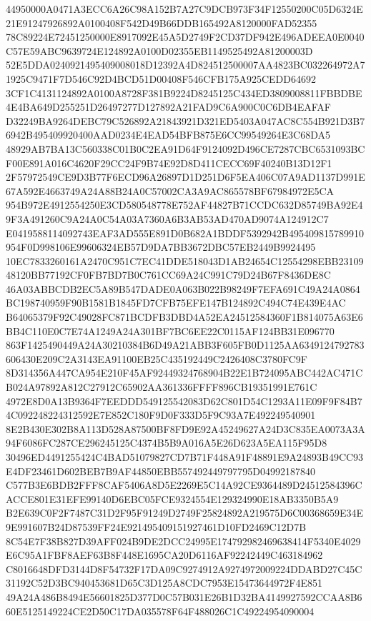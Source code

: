 \documentclass[UTF8,fontset=fandol,zihao=-4,a4paper]{ctexart}
\begin{document}
{{44950000A0471A3ECC6A26C98A152B7A27C9DCB973F34F12550200C05D6324E21E91247926892A0100408F542D49B66DDB165492A8120000FAD52355
78C89224E72451250000E8917092E45A5D2749F2CD37DF942E496ADEEA0E0040C57E59ABC9639724E124892A0100D02355EB1149525492A81200003D
52E5DDA0240921495409008018D12392A4D824512500007AA4823BC032264972A71925C9471F7D546C92D4BCD51D00408F546CFB175A925CEDD64692
3CF1C4131124892A0100A8728F381B9224D8245125C434ED3809008811FBBDBE4E4BA649D255251D26497277D127892A21FAD9C6A900C0C6DB4EAFAF
D32249BA9264DEBC79C526892A21843921D321ED5403A047AC8C554B921D3B76942B495409920400AAD0234E4EAD54BFB875E6CC99549264E3C68DA5
48929AB7BA13C560338C01B0C2EA91D64F9124092D496CE7287CBC6531093BCF00E891A016C4620F29CC24F9B74E92D8D411CECC69F40240B13D12F1
2F57972549CE9D3B77F6ECD96A26897D1D251D6F5EA406C07A9AD1137D991E67A592E4663749A24A88B24A0C57002CA3A9AC865578BF67984972E5CA
954B972E4912554250E3CD580548778E752AF44827B71CCDC632D85749BA92E49F3A491260C9A24A0C54A03A7360A6B3AB53AD470AD9074A124912C7
E0419588114092743EAF3AD555E891D0B682A1BDDF5392942B495409815789910954F0D998106E99606324EB57D9DA7BB3672DBC57EB2449B9924495
10EC7833260161A2470C951C7EC41DDE518043D1AB24654C12554298EBB2310948120BB77192CF0FB7BD7B0C761CC69A24C991C79D24B67F8436DE8C
46A03ABBCDB2EC5A89B547DADE0A063B022B98249F7EFA691C49A24A0864BC198740959F90B1581B1845FD7CFB75EFE147B124892C494C74E439E4AC
B64065379F92C49028FC871BCDFB3DBD4A52EA24512584360F1B814075A63E6BB4C110E0C7E74A1249A24A301BF7BC6EE22C0115AF124BB31E096770
863F1425490449A24A30210384B6D49A21ABB3F605FB0D1125AA6349124792783606430E209C2A3143EA91100EB25C435192449C2426408C3780FC9F
8D314356A447CA954E210F45AF92449324768904B22E1B724095ABC442AC471CB024A97892A812C27912C65902AA361336FFFF896CB19351991E761C
4972E8D0A13B9364F7EEDDD549125542083D62C801D54C1293A11E09F9F84B74C092248224312592E7E852C180F9D0F333D5F9C93A7E492249540901
8E2B430E302B8A113D528A87500BF8FD9E92A45249627A24D3C835EA0073A3A94F6086FC287CE296245125C4374B5B9A016A5E26D623A5EA115F95D8
30496ED4491255424C4BAD51079827CD7B71F448A91F48891E9A24893B49CC93E4DF23461D602BEB7B9AF44850EBB557492449797795D04992187840
C577B3E6BDB2FFF8CAF5406A8D5E2269E5C14A92CE9364489D24512584396CACCE801E31EFE99140D6EBC05FCE9324554E129324990E18AB3350B5A9
B2E639C0F2F7487C31D2F95F91249D2749F25824892A219575D6C00368659E34E9E991607B24D87539FF24E921495409151927461D10FD2469C12D7B
8C54E7F38B827D39AFF024B9DE2DCC24995E174792982469638414F5340E4029E6C95A1FBF8AEF63B8F448E1695CA20D6116AF92242449C463184962
C8016648DFD3144D8F54732F17DA09C9274912A9274972009224DDABD27C45C31192C52D3BC940453681D65C3D125A8CDC7953E15473644972F4E851
49A24A486B8494E56601825D377D0C57B031E26B1D32BA4149927592CCAA8B660E5125149224CE2D50C17DA035578F64F488026C1C49224954090004
}}
\end{document}
